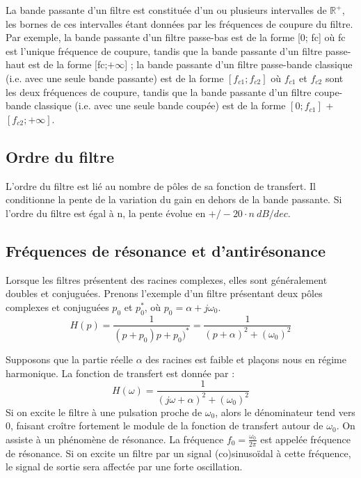 	La bande passante d’un filtre est constituée d’un ou plusieurs intervalles de $\mathbb{R}^{+}$, les bornes de ces intervalles étant données par les fréquences de coupure du filtre. Par exemple, la bande passante d’un filtre passe-bas est de la forme [0; fc] où fc est l’unique fréquence de coupure, tandis que la bande passante d’un filtre passe-haut est de la forme [fc;$+\infty$] ; la bande passante d’un filtre passe-bande classique (i.e. avec une seule bande passante) est de la forme $[f_{c1}; f_{c2}]$ où $f_{c1}$ et $f_{c2}$ sont les deux fréquences de coupure, tandis que la bande passante d’un filtre coupe-bande classique (i.e. avec une seule bande coupée) est de la forme $[0;f_{c1}]$ + $[f_{c2};+\infty]$.
	
	\subsection{Ordre du filtre}
	L'ordre du filtre est lié au nombre de pôles de sa fonction de transfert. Il conditionne la pente de la variation du gain en dehors de la bande passante. Si l'ordre du filtre est égal à n, la pente évolue en $+/-20\cdot n~dB/dec$.
	
	\subsection{Fréquences de résonance et d'antirésonance}
	Lorsque les filtres présentent des racines complexes, elles sont généralement doubles et conjuguées.	Prenons l'exemple d'un filtre présentant deux pôles complexes et conjuguées $p_{0}$ et $p_{0}^{*}$, où $p_{0}=\alpha+j\omega_{0}$.
	\begin{equation*}
	H(p)=\frac{1}{(p+p_{0})p+p_{0})^{*}}=\frac{1}{(p+\alpha)^{2}+(\omega_{0})^{2}}
	\end{equation*}
	
	Supposons que la partie réelle $\alpha$ des racines est faible et plaçons nous en régime harmonique. La fonction de transfert est donnée par :
	\begin{equation*}
	H(\omega)=\frac{1}{(j\omega+\alpha)^{2}+(\omega_{0})^{2}}
	\end{equation*}
	Si on excite le filtre à une pulsation proche de $\omega_{0}$, alors le dénominateur tend vers 0, faisant croître fortement le module de la fonction de transfert autour de $\omega_{0}$. On assiste à un phénomène de résonance. La fréquence $f_{0}=\frac{\omega_{0}}{2\pi}$ est appelée fréquence de résonance. Si on excite un filtre par un signal (co)sinusoïdal à cette fréquence, le signal de sortie sera affectée par une forte oscillation.
	
